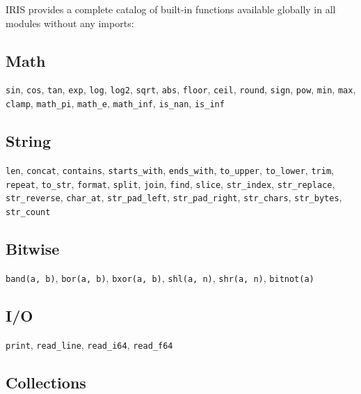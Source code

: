 \documentclass[
  english,
]{book}
\begin{document}
IRIS provides a complete catalog of built-in functions available
globally in all modules without any imports:

\subsection{Math}\label{math}

\texttt{sin}, \texttt{cos}, \texttt{tan}, \texttt{exp}, \texttt{log},
\texttt{log2}, \texttt{sqrt}, \texttt{abs}, \texttt{floor},
\texttt{ceil}, \texttt{round}, \texttt{sign}, \texttt{pow},
\texttt{min}, \texttt{max}, \texttt{clamp}, \texttt{math\_pi},
\texttt{math\_e}, \texttt{math\_inf}, \texttt{is\_nan}, \texttt{is\_inf}

\subsection{String}\label{string}

\texttt{len}, \texttt{concat}, \texttt{contains}, \texttt{starts\_with},
\texttt{ends\_with}, \texttt{to\_upper}, \texttt{to\_lower},
\texttt{trim}, \texttt{repeat}, \texttt{to\_str}, \texttt{format},
\texttt{split}, \texttt{join}, \texttt{find}, \texttt{slice},
\texttt{str\_index}, \texttt{str\_replace}, \texttt{str\_reverse},
\texttt{char\_at}, \texttt{str\_pad\_left}, \texttt{str\_pad\_right},
\texttt{str\_chars}, \texttt{str\_bytes}, \texttt{str\_count}

\subsection{Bitwise}\label{bitwise}

\texttt{band(a,\ b)}, \texttt{bor(a,\ b)}, \texttt{bxor(a,\ b)},
\texttt{shl(a,\ n)}, \texttt{shr(a,\ n)}, \texttt{bitnot(a)}

\subsection{I/O}\label{io}

\texttt{print}, \texttt{read\_line}, \texttt{read\_i64},
\texttt{read\_f64}

\subsection{Collections}\label{collections}
\end{document}

